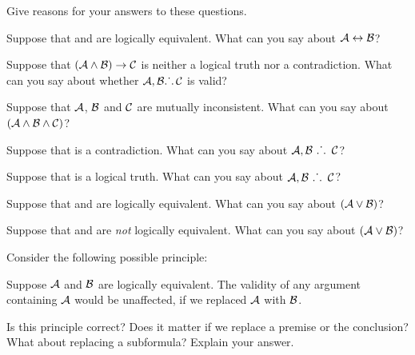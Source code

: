 \documentclass[PHIL101-Textbook.tex]{subfiles}
\begin{document}
\noindent\solutions
\problempart
\label{pr.TT.concepts}
Give reasons for your answers to these questions.
\begin{earg}
\item Suppose that  and  are logically equivalent. What can you say about $\mathcal{A}\leftrightarrow\mathcal{B}$?
\item Suppose that $(\mathcal{A}\land\mathcal{B})\rightarrow\mathcal{C}$ is neither a logical truth nor a contradiction. What can you say about whether $\mathcal{A}, \mathcal{B} \ldotp\dot{}\,\ldotp\mathcal{C}$ is valid?
\item Suppose that $\mathcal{A}$, $\mathcal{B}$ and $\mathcal{C}$  are mutually inconsistent. What can you say about $(\mathcal{A}\land\mathcal{B}\land\mathcal{C})$?
\item Suppose that  is a contradiction. What can you say about $\meta{A}, \meta{B} \ \therefore\ \meta{C}$?
\item Suppose that  is a logical truth. What can you say about $\meta{A}, \meta{B}\ \therefore\  \meta{C}$?
\item Suppose that  and  are logically equivalent. What can you say about $(\mathcal{A}\vee\mathcal{B})$?
\item Suppose that  and  are \emph{not} logically equivalent. What can you say about $(\mathcal{A}\vee\mathcal{B})$?
\end{earg}
\problempart 
Consider the following possible principle:
	\begin{ebullet}
  \item Suppose $\mathcal{A}$ and $\mathcal{B}$ are logically equivalent. The validity of any argument containing $\mathcal{A}$ would be unaffected, if we replaced $\mathcal{A}$ with $\mathcal{B}$.
	\end{ebullet}
Is this principle correct? Does it matter if we replace a premise or the conclusion? What about replacing a subformula? Explain your answer.
\end{document}
